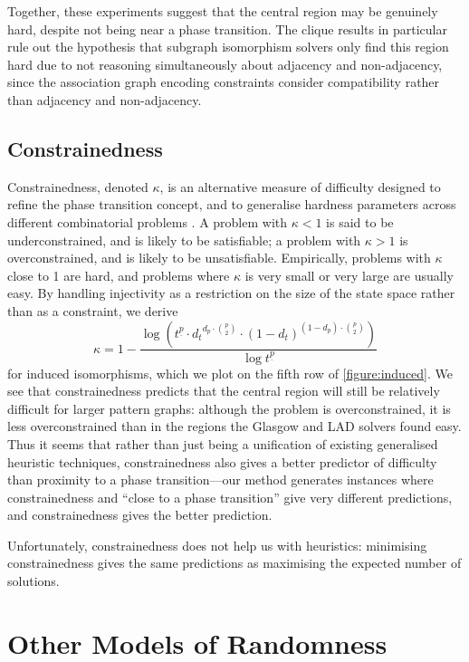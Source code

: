\documentclass[twoside,11pt]{article}
\newcommand{\citep}[1]{\cite{#1}}
\begin{document}
Together, these experiments suggest that the central region may be genuinely hard, despite not being
near a phase transition. The clique results in particular rule out the hypothesis that subgraph
isomorphism solvers only find this region hard due to not reasoning simultaneously about adjacency
and non-adjacency, since the association graph encoding constraints consider compatibility rather
than adjacency and non-adjacency.

\subsection{Constrainedness}

Constrainedness, denoted $\kappa$, is an alternative measure of difficulty designed to refine the
phase transition concept, and to generalise hardness parameters across different combinatorial
problems \citep{Gent:1996:Kappa}. A problem with $\kappa < 1$ is said to be underconstrained, and is
likely to be satisfiable; a problem with $\kappa > 1$ is overconstrained, and is likely to be
unsatisfiable. Empirically, problems with $\kappa$ close to 1 are hard, and problems where $\kappa$
is very small or very large are usually easy. By handling injectivity as a restriction on the size
of the state space rather than as a constraint, we derive \begin{equation} \kappa = 1 - \frac{\log \left(
t^{\underline{p}} \cdot {d_t}^{d_p \cdot \binom{p}{2}} \cdot {(1 - d_{t})}^{(1 - d_{p}) \cdot
\binom{p}{2}} \right)}{\log t^{\underline{p}}} \end{equation} for induced isomorphisms, which we plot on the
fifth row of \cref{figure:induced}. We see that constrainedness predicts that the central region
will still be relatively difficult for larger pattern graphs: although the problem is
overconstrained, it is less overconstrained than in the regions the Glasgow and LAD solvers found
easy.  Thus it seems that rather than just being a unification of existing generalised heuristic
techniques, constrainedness also gives a better predictor of difficulty than proximity to a phase
transition---our method generates instances where constrainedness and ``close to a phase
transition'' give very different predictions, and constrainedness gives the better prediction.

Unfortunately, constrainedness does not help us with heuristics: minimising constrainedness gives
the same predictions as maximising the expected number of solutions.

\section{Other Models of Randomness}\label{section:models}
\end{document}
